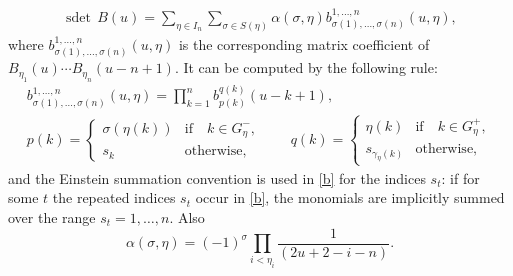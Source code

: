\documentclass[pdftex]{sigma}
\begin{document}
  \begin{theorem}\label{sdet}
\begin{gather*}%
\operatorname{sdet}\, B(u)=
\sum_{ \eta\in I_n } \sum_{\sigma\in S(\eta)}  \alpha(\sigma, \eta)
b^{1,\dots , n}_{\sigma(1),\dots, \sigma(n)}(u,\eta),
\end{gather*}
where $b^{1,\dots ,n}_{\sigma(1),\dots , \sigma(n)}(u,\eta)$ is the corresponding matrix coefficient of   $B_{\eta_1}(u) \cdots B_{\eta_n}(u-n+1)$. It can be computed by the following rule:
 \begin{gather}\label{b}
b^{1,\dots ,n}_{\sigma(1),\dots, \sigma(n)}(u,\eta)=
   \prod_{k=1}^{n}
b_{p(k)}^{q(k)}(u-k+1),\\
 p{(k)}=
\begin{cases}
\sigma(\eta(k))  &  \text{if}\quad k\in G_\eta^ -,\\
s_k& \text{otherwise},
\end{cases}
\qquad
q{(k)}=
\begin{cases}
\eta(k)  &\text{if}\quad
k\in G_\eta^+ ,\\
s_{\gamma_\eta(k)}&\text{otherwise},
\end{cases}\nonumber
\end{gather}
 and  the Einstein summation convention is used in \eqref{b} for the indices $s_t$: if  for some $t$ the repeated indices $s_t$ occur in \eqref{b}, the monomials are implicitly summed over  the range $s_t=1,\dots, n$.
Also
\[
\alpha(\sigma, \eta)=(-1)^{\sigma}
\prod_{i<\eta_i} \frac{1}{(2u+2-i-n)}.
\]
\end{theorem}
\end{document}
